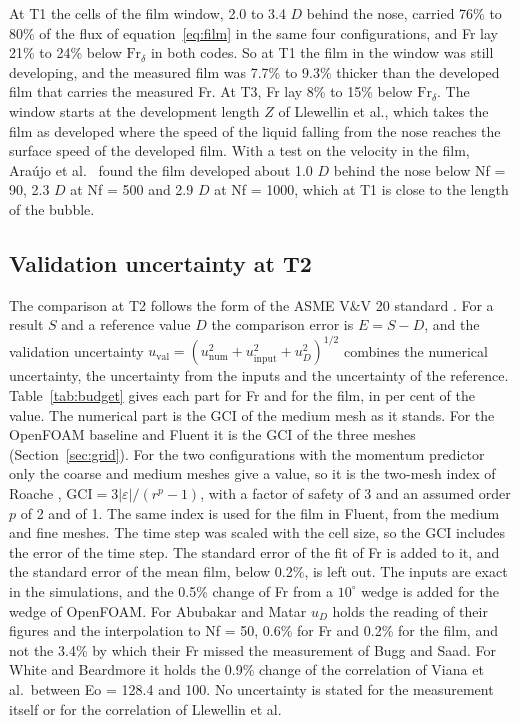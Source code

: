 \documentclass[11pt,a4paper]{article}
\begin{document}
At T1 the cells of the film window, 2.0 to 3.4 $D$ behind the nose, carried 76\% to 80\% of the flux of equation~\eqref{eq:film} in the same four configurations, and Fr lay 21\% to 24\% below $\mathrm{Fr}_\delta$ in both codes. So at T1 the film in the window was still developing, and the measured film was 7.7\% to 9.3\% thicker than the developed film that carries the measured Fr. At T3, Fr lay 8\% to 15\% below $\mathrm{Fr}_\delta$. The window starts at the development length $Z$ of Llewellin et al., which takes the film as developed where the speed of the liquid falling from the nose reaches the surface speed of the developed film. With a test on the velocity in the film, Ara\'ujo et al.\ \cite{araujo2012wide} found the film developed about 1.0 $D$ behind the nose below Nf = 90, 2.3 $D$ at Nf = 500 and 2.9 $D$ at Nf = 1000, which at T1 is close to the length of the bubble.

\subsection{Validation uncertainty at T2}
\label{sec:budget}

The comparison at T2 follows the form of the ASME V\&V 20 standard \cite{ASME_VV20}. For a result $S$ and a reference value $D$ the comparison error is $E = S - D$, and the validation uncertainty $u_\mathrm{val} = (u_\mathrm{num}^2 + u_\mathrm{input}^2 + u_D^2)^{1/2}$ combines the numerical uncertainty, the uncertainty from the inputs and the uncertainty of the reference. Table~\ref{tab:budget} gives each part for Fr and for the film, in per cent of the value. The numerical part is the GCI of the medium mesh as it stands. For the OpenFOAM baseline and Fluent it is the GCI of the three meshes (Section~\ref{sec:grid}). For the two configurations with the momentum predictor only the coarse and medium meshes give a value, so it is the two-mesh index of Roache \cite{Roache1994}, $\mathrm{GCI} = 3|\varepsilon|/(r^p - 1)$, with a factor of safety of 3 and an assumed order $p$ of 2 and of 1. The same index is used for the film in Fluent, from the medium and fine meshes. The time step was scaled with the cell size, so the GCI includes the error of the time step. The standard error of the fit of Fr is added to it, and the standard error of the mean film, below 0.2\%, is left out. The inputs are exact in the simulations, and the 0.5\% change of Fr from a $10^\circ$ wedge is added for the wedge of OpenFOAM. For Abubakar and Matar $u_D$ holds the reading of their figures and the interpolation to Nf = 50, 0.6\% for Fr and 0.2\% for the film, and not the 3.4\% by which their Fr missed the measurement of Bugg and Saad. For White and Beardmore it holds the 0.9\% change of the correlation of Viana et al.\ between Eo = 128.4 and 100. No uncertainty is stated for the measurement itself or for the correlation of Llewellin et al.
\end{document}
